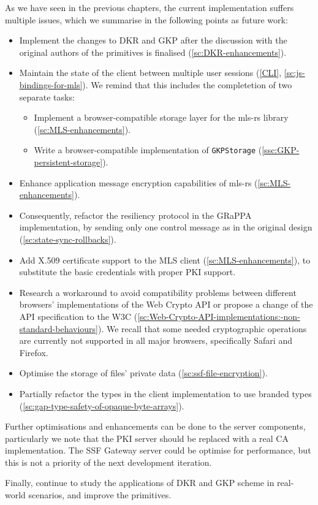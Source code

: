As we have seen in the previous chapters,
the current implementation suffers multiple issues,
which we summarise in the following points as future work:
\begin{itemize}
    \item Implement the changes to DKR and GKP after the discussion with the original authors of the primitives is finalised (\cref{sc:DKR-enhancements}).
    \item Maintain the state of the client between multiple user sessions (\cref{CLI}, \cref{sc:js-bindings-for-mls}). We remind that this includes the completetion of two separate tasks:
    \begin{itemize}
        \item Implement a browser-compatible storage layer for the mls-rs library (\cref{sc:MLS-enhancements}).
        \item Write a browser-compatible implementation of \texttt{GKPStorage} (\cref{ssc:GKP-persistent-storage}).
    \end{itemize}
    \item Enhance application message encryption capabilities of mls-rs (\cref{sc:MLS-enhancements}).
    \item Consequently, refactor the resiliency protocol in the GRaPPA implementation, by sending only one control message as in the original design (\cref{sc:state-sync-rollbacks}).
    \item Add X.509 certificate support to the MLS client (\cref{sc:MLS-enhancements}), to substitute the basic credentials with proper PKI support.
    \item Research a workaround to avoid compatibility problems between different browsers' implementations of the Web Crypto API or propose a change of the API specification to the W3C  (\cref{sc:Web-Crypto-API-implementations:-non-standard-behaviours}). We recall that some needed cryptographic operations are currently not supported in all major browsers, specifically Safari and Firefox. 
    \item Optimise the storage of files' private data (\cref{sc:ssf-file-encryption}).
    \item Partially refactor the types in the client implementation to use branded types (\cref{sc:gap-type-safety-of-opaque-byte-arrays}).
\end{itemize}

Further optimisations and enhancements can be done
to the server components, particularly we note that
the PKI server should be replaced with a real CA
implementation. The SSF Gateway server could be optimise
for performance, but this is not a priority of the
next development iteration.

Finally, continue to study the applications of DKR and GKP scheme in
real-world scenarios, and improve the primitives.
